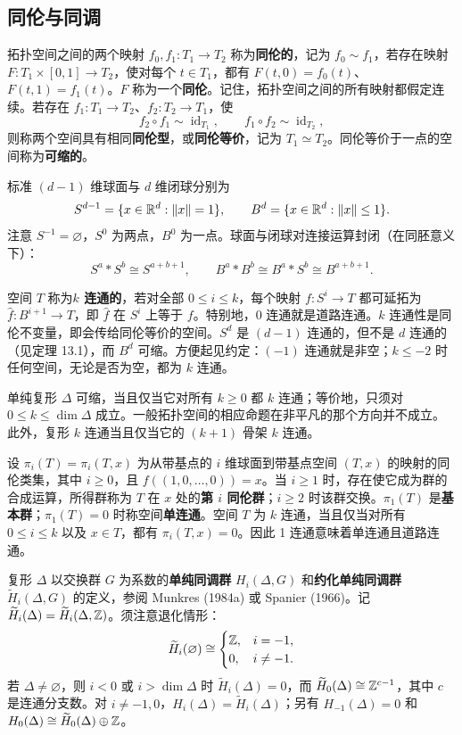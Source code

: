 \subsection*{同伦与同调}
拓扑空间之间的两个映射 $f_0,f_1:T_1\to T_2$ 称为\textbf{同伦的}，记为 $f_0\sim f_1$，若存在映射 $F:T_1\times[0,1]\to T_2$，使对每个 $t\in T_1$，都有 $F(t,0)=f_0(t)$、$F(t,1)=f_1(t)$。$F$ 称为一个\textbf{同伦}。记住，拓扑空间之间的所有映射都假定连续。若存在 $f_1:T_1\to T_2$、$f_2:T_2\to T_1$，使
\[
f_2\circ f_1\sim\operatorname{id}_{T_1},\qquad
f_1\circ f_2\sim\operatorname{id}_{T_2},
\]
则称两个空间具有相同\textbf{同伦型}，或\textbf{同伦等价}，记为 $T_1\simeq T_2$。同伦等价于一点的空间称为\textbf{可缩的}。

标准 $(d-1)$ 维球面与 $d$ 维闭球分别为
\[
S^{d-1}=\{x\in\mathbb R^d:\|x\|=1\},\qquad
B^d=\{x\in\mathbb R^d:\|x\|\le1\}.
\]
注意 $S^{-1}=\varnothing$，$S^0$ 为两点，$B^0$ 为一点。球面与闭球对连接运算封闭（在同胚意义下）：
\[
S^a*S^b\cong S^{a+b+1},\qquad
B^a*B^b\cong B^a*S^b\cong B^{a+b+1}.
\]

空间 $T$ 称为\textbf{$k$ 连通的}，若对全部 $0\le i\le k$，每个映射 $f:S^i\to T$ 都可延拓为 $\widehat f:B^{i+1}\to T$，即 $\widehat f$ 在 $S^i$ 上等于 $f$。特别地，0 连通就是道路连通。$k$ 连通性是同伦不变量，即会传给同伦等价的空间。$S^d$ 是 $(d-1)$ 连通的，但不是 $d$ 连通的（见定理 13.1），而 $B^d$ 可缩。方便起见约定：$(-1)$ 连通就是非空；$k\le-2$ 时任何空间，无论是否为空，都为 $k$ 连通。

单纯复形 $\Delta$ 可缩，当且仅当它对所有 $k\ge0$ 都 $k$ 连通；等价地，只须对 $0\le k\le\dim\Delta$ 成立。一般拓扑空间的相应命题在非平凡的那个方向并不成立。此外，复形 $k$ 连通当且仅当它的 $(k+1)$ 骨架 $k$ 连通。

设 $\pi_i(T)=\pi_i(T,x)$ 为从带基点的 $i$ 维球面到带基点空间 $(T,x)$ 的映射的同伦类集，其中 $i\ge0$，且 $f((1,0,\ldots,0))=x$。当 $i\ge1$ 时，存在使它成为群的合成运算，所得群称为 $T$ 在 $x$ 处的\textbf{第 $i$ 同伦群}；$i\ge2$ 时该群交换。$\pi_1(T)$ 是\textbf{基本群}；$\pi_1(T)=0$ 时称空间\textbf{单连通}。空间 $T$ 为 $k$ 连通，当且仅当对所有 $0\le i\le k$ 以及 $x\in T$，都有 $\pi_i(T,x)=0$。因此 1 连通意味着单连通且道路连通。

复形 $\Delta$ 以交换群 $G$ 为系数的\textbf{单纯同调群} $H_i(\Delta,G)$ 和\textbf{约化单纯同调群} $\widetilde H_i(\Delta,G)$ 的定义，参阅 Munkres (1984a) 或 Spanier (1966)。记 $\widetilde H_i(\Delta)=\widetilde H_i(\Delta,\mathbb Z)$。须注意退化情形：
\[
\widetilde H_i(\varnothing)\cong
\begin{cases}\mathbb Z,&i=-1,\\0,&i\ne-1.\end{cases}
\]
若 $\Delta\ne\varnothing$，则 $i<0$ 或 $i>\dim\Delta$ 时 $\widetilde H_i(\Delta)=0$，而 $\widetilde H_0(\Delta)\cong\mathbb Z^{c-1}$，其中 $c$ 是连通分支数。对 $i\ne-1,0$，$H_i(\Delta)=\widetilde H_i(\Delta)$；另有 $H_{-1}(\Delta)=0$ 和 $H_0(\Delta)\cong\widetilde H_0(\Delta)\oplus\mathbb Z$。

